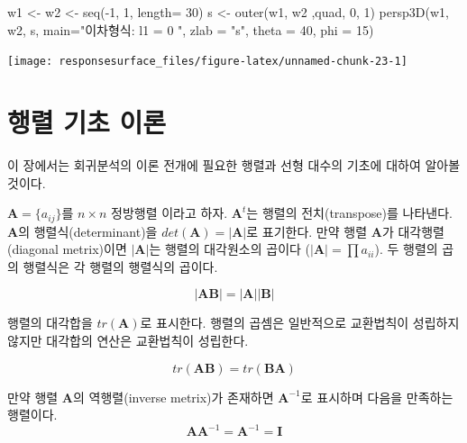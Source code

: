 \documentclass[
]{book}
\newenvironment{Shaded}{\begin{snugshade}}{\end{snugshade}}
\newcommand{\AttributeTok}[1]{\textcolor[rgb]{0.77,0.63,0.00}{#1}}
\newcommand{\DecValTok}[1]{\textcolor[rgb]{0.00,0.00,0.81}{#1}}
\newcommand{\FunctionTok}[1]{\textcolor[rgb]{0.00,0.00,0.00}{#1}}
\newcommand{\NormalTok}[1]{#1}
\newcommand{\OtherTok}[1]{\textcolor[rgb]{0.56,0.35,0.01}{#1}}
\newcommand{\SpecialCharTok}[1]{\textcolor[rgb]{0.00,0.00,0.00}{#1}}
\newcommand{\StringTok}[1]{\textcolor[rgb]{0.31,0.60,0.02}{#1}}
\newcommand{\bm}[1]{\boldsymbol{\mathbf{#1}}}
\theoremstyle{definition}
\theoremstyle{definition}
\theoremstyle{definition}
\theoremstyle{definition}
\theoremstyle{remark}
\begin{document}
\begin{Shaded}
\begin{Highlighting}[]
\NormalTok{w1 }\OtherTok{\textless{}{-}}\NormalTok{ w2 }\OtherTok{\textless{}{-}} \FunctionTok{seq}\NormalTok{(}\SpecialCharTok{{-}}\DecValTok{1}\NormalTok{, }\DecValTok{1}\NormalTok{, }\AttributeTok{length=} \DecValTok{30}\NormalTok{)}
\NormalTok{s }\OtherTok{\textless{}{-}} \FunctionTok{outer}\NormalTok{(w1, w2 ,quad, }\DecValTok{0}\NormalTok{, }\DecValTok{1}\NormalTok{)}
\FunctionTok{persp3D}\NormalTok{(w1, w2, s,}
      \AttributeTok{main=}\StringTok{"이차형식: l1 =  0 "}\NormalTok{,}
      \AttributeTok{zlab =} \StringTok{"s"}\NormalTok{,}
      \AttributeTok{theta =} \DecValTok{40}\NormalTok{, }\AttributeTok{phi =} \DecValTok{15}\NormalTok{)}
\end{Highlighting}
\end{Shaded}

\begin{center}\texttt{[image: responsesurface\_files/figure-latex/unnamed-chunk-23-1]} \end{center}

\hypertarget{appendix-appendix}{%
\appendix {}}


\hypertarget{matrixalgebra}{%
\chapter{행렬 기초 이론}\label{matrixalgebra}}

이 장에서는 회귀분석의 이론 전개에 필요한 행렬과 선형 대수의 기초에 대하여 알아볼 것이다.

\(\bm A = \{ a_{ij} \}\)를 \(n \times n\) 정방행렬 이라고 하자. \(\bm A^t\)는 행렬의 전치(transpose)를 나타낸다. \(\bm A\)의 행렬식(determinant)을 \(det(\bm A)=|\bm A|\)로 표기한다. 만약 행렬 \(\bm A\)가 대각행렬(diagonal metrix)이면 \(|\bm A|\)는 행렬의 대각원소의 곱이다 (\(| \bm A| =\prod a_{ii}\)). 두 행렬의 곱의 행렬식은 각 행렬의 행렬식의 곱이다.

\[ |\bm A \bm B | = | \bm A| |\bm B| \]

행렬의 대각합을 \(tr(\bm A)\)로 표시한다. 행렬의 곱셈은 일반적으로 교환법칙이 성립하지 않지만 대각합의 연산은 교환법칙이 성립한다.

\[  tr(\bm A \bm B)  = tr( \bm B \bm A) \]

만약 행렬 \(\bm A\)의 역행렬(inverse metrix)가 존재하면 \(\bm A^{-1}\)로 표시하며 다음을 만족하는 행렬이다.
\[ \bm A \bm A^{-1} = \bm A^{-1} = \bm I \]
\end{document}
